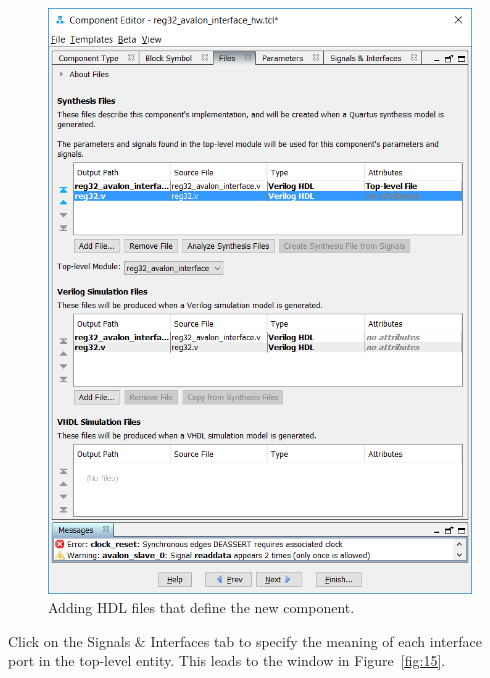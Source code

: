 \documentclass[11pt, twoside, pdftex]{article}
\begin{document}
\begin{figure}[H]
   \begin{center}
        \includegraphics[scale=0.55]{figures/figure14.png}
   \end{center}
   \caption{Adding HDL files that define the new component.}
	\label{fig:14}
\end{figure}

\clearpage
\newpage
Click on the {\sf Signals \& Interfaces} tab to specify the meaning of each interface port in the 
top-level entity. This leads to the window in Figure~\ref{fig:15}. 
\end{document}
